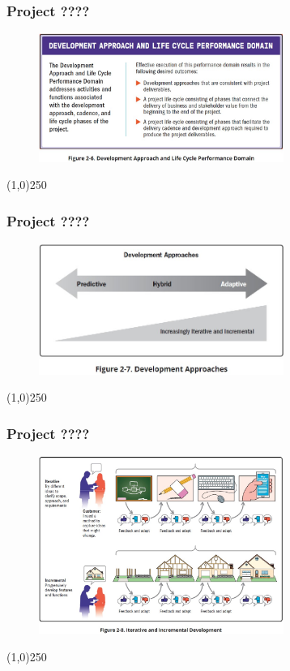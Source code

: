 \begin{frame}
\frametitle{Project ????}
 \begin{figure}
    \centering
        \includegraphics[width = 8cm]{../images/guide/Fig2-6.jpg}
    \label{guidefig:2-6}
 \end{figure}
\end{frame}
\begin{center}\line(1,0){250}\end{center}

\begin{frame}
\frametitle{Project ????}
 \begin{figure}
    \centering
        \includegraphics[width = 8cm]{../images/guide/Fig2-7.jpg}
    \label{guidefig:2-7}
 \end{figure}
\end{frame}
\begin{center}\line(1,0){250}\end{center}

\begin{frame}
\frametitle{Project ????}
 \begin{figure}
    \centering
        \includegraphics[width = 8cm]{../images/guide/Fig2-8.jpg}
    \label{guidefig:2-8}
 \end{figure}
\end{frame}
\begin{center}\line(1,0){250}\end{center}

